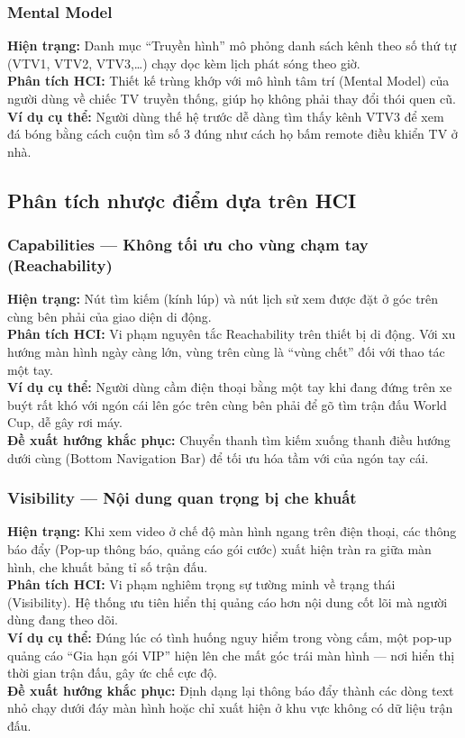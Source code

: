 \subsubsection{Mental Model}
\textbf{Hiện trạng:} Danh mục ``Truyền hình'' mô phỏng danh sách kênh theo số thứ tự (VTV1, VTV2, VTV3,\dots) chạy dọc kèm lịch phát sóng theo giờ.\\
\textbf{Phân tích HCI:} Thiết kế trùng khớp với mô hình tâm trí (Mental Model) của người dùng về chiếc TV truyền thống, giúp họ không phải thay đổi thói quen cũ.\\
\textbf{Ví dụ cụ thể:} Người dùng thế hệ trước dễ dàng tìm thấy kênh VTV3 để xem đá bóng bằng cách cuộn tìm số 3 đúng như cách họ bấm remote điều khiển TV ở nhà.

\subsection{Phân tích nhược điểm dựa trên HCI}

\subsubsection{Capabilities --- Không tối ưu cho vùng chạm tay (Reachability)}
\textbf{Hiện trạng:} Nút tìm kiếm (kính lúp) và nút lịch sử xem được đặt ở góc trên cùng bên phải của giao diện di động.\\
\textbf{Phân tích HCI:} Vi phạm nguyên tắc Reachability trên thiết bị di động. Với xu hướng màn hình ngày càng lớn, vùng trên cùng là ``vùng chết'' đối với thao tác một tay.\\
\textbf{Ví dụ cụ thể:} Người dùng cầm điện thoại bằng một tay khi đang đứng trên xe buýt rất khó với ngón cái lên góc trên cùng bên phải để gõ tìm trận đấu World Cup, dễ gây rơi máy.\\
\textbf{Đề xuất hướng khắc phục:} Chuyển thanh tìm kiếm xuống thanh điều hướng dưới cùng (Bottom Navigation Bar) để tối ưu hóa tầm với của ngón tay cái.

\subsubsection{Visibility --- Nội dung quan trọng bị che khuất}
\textbf{Hiện trạng:} Khi xem video ở chế độ màn hình ngang trên điện thoại, các thông báo đẩy (Pop-up thông báo, quảng cáo gói cước) xuất hiện tràn ra giữa màn hình, che khuất bảng tỉ số trận đấu.\\
\textbf{Phân tích HCI:} Vi phạm nghiêm trọng sự tường minh về trạng thái (Visibility). Hệ thống ưu tiên hiển thị quảng cáo hơn nội dung cốt lõi mà người dùng đang theo dõi.\\
\textbf{Ví dụ cụ thể:} Đúng lúc có tình huống nguy hiểm trong vòng cấm, một pop-up quảng cáo ``Gia hạn gói VIP'' hiện lên che mất góc trái màn hình --- nơi hiển thị thời gian trận đấu, gây ức chế cực độ.\\
\textbf{Đề xuất hướng khắc phục:} Định dạng lại thông báo đẩy thành các dòng text nhỏ chạy dưới đáy màn hình hoặc chỉ xuất hiện ở khu vực không có dữ liệu trận đấu.

